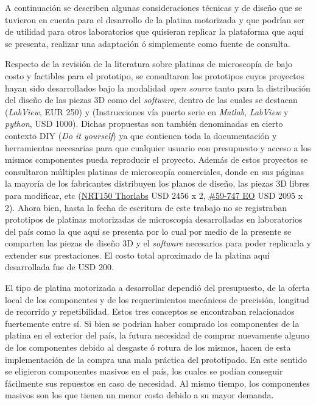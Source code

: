 A continuación se describen algunas consideraciones técnicas y de diseño que se tuvieron en cuenta para el desarrollo de la platina motorizada y que podrían ser de utilidad para otros laboratorios que quisieran replicar la plataforma que aquí se presenta, realizar una adaptación ó simplemente como fuente de consulta.

Respecto de la revisión de la literatura sobre platinas de microscopía de bajo costo y factibles para el prototipo, se consultaron  los prototipos cuyos proyectos hayan sido desarrollados bajo la modalidad \textit{open source} tanto para la distribución del diseño de las piezas 3D como del \textit{software}, dentro de las cuales se destacan \cite{schaa}(\textit{LabView}, EUR 250) y \cite{campbells}(Instrucciones vía puerto serie en \textit{Matlab}, \textit{LabView} y \textit{python}, USD 1000). Dichas propuestas son también denominadas en cierto contexto DIY (\textit{Do it yourself}) ya que contienen toda la documentación y herramientas necesarias para que cualquier usuario con presupuesto y acceso a los mismos componentes pueda reproducir el proyecto. Además de estos proyectos se consultaron múltiples platinas de microscopía comerciales, donde en sus páginas la mayoría de los fabricantes distribuyen los planos de diseño, las piezas 3D libres para modificar, etc (\href{https://www.thorlabs.com/newgrouppage9.cfm?objectgroup\_id=2132}{NRT150 Thorlabs} USD 2456 x 2, \href{https://www.edmundoptics.com/p/150mm-motorized-stage/16419/}{\#59-747 EO} USD 2095 x 2). Ahora bien, hasta la fecha de escritura de este trabajo no se registraban prototipos de platinas motorizadas de microscopía desarrolladas en laboratorios del país como la que aquí se presenta por lo cual por medio de la presente se comparten las piezas de diseño 3D y el \textit{software} necesarios para poder replicarla y extender sus prestaciones. El costo total aproximado de la platina aquí desarrollada fue de USD 200.

El tipo de platina motorizada a desarrollar dependió del presupuesto, de la oferta local de los componentes y de los requerimientos mecánicos de precisión, longitud de recorrido y repetibilidad. Estos tres conceptos se encontraban relacionados fuertemente entre sí. Si bien se podrian haber comprado los componentes de la platina en el exterior del país, la futura necesidad de comprar nuevamente alguno de los componentes debido al desgaste ó rotura de los mismos, hacen de esta implementación de la compra una mala práctica del prototipado. En este sentido se eligieron componentes masivos en el país, los cuales se podían conseguir fácilmente sus repuestos en caso de necesidad. Al mismo tiempo, los componentes masivos son los que tienen un menor costo debido a su mayor demanda.

